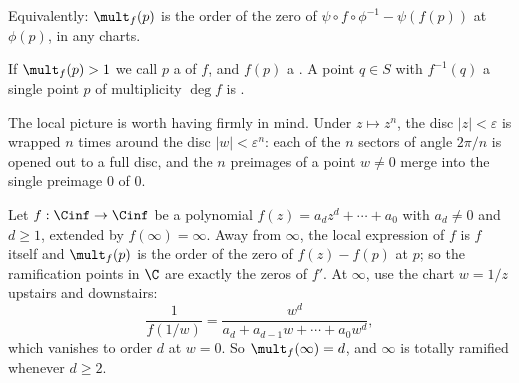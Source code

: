 Equivalently: $\mult_f(p)$ is the order of the zero of $\psi\circ f\circ\phi^{-1} - \psi(f(p))$
at $\phi(p)$, in any charts.

\begin{definition}
	If $\mult_f(p) > 1$ we call $p$ a  of $f$, and $f(p)$ a
	. A point $q \in S$ with $f^{-1}(q)$ a single point $p$ of
	multiplicity $\deg f$ is .
\end{definition}

The local picture is worth having firmly in mind. Under $z \mapsto z^n$, the disc
$|z|<\varepsilon$ is wrapped $n$ times around the disc $|w| < \varepsilon^n$: each of the
$n$ sectors of angle $2\pi/n$ is opened out to a full disc, and the $n$ preimages of a
point $w \neq 0$ merge into the single preimage $0$ of $0$.

\begin{center}
\end{center}

\begin{example}\label{ex:polymult}
	Let $f : \Cinf \to \Cinf$ be a polynomial $f(z) = a_dz^d + \cdots + a_0$ with
	$a_d \neq 0$ and $d \geq 1$, extended by $f(\infty) = \infty$. Away from $\infty$, the
	local expression of $f$ is $f$ itself and $\mult_f(p)$ is the order of the zero of
	$f(z) - f(p)$ at $p$; so the ramification points in $\C$ are exactly the zeros of $f'$.
	At $\infty$, use the chart $w = 1/z$ upstairs and downstairs:
	$$
	\frac{1}{f(1/w)} = \frac{w^d}{a_d + a_{d-1}w+\cdots+a_0w^d},
	$$
	which vanishes to order $d$ at $w = 0$. So $\mult_f(\infty) = d$, and $\infty$ is
	totally ramified whenever $d \geq 2$.
\end{example}

